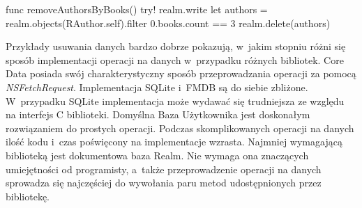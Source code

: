 \begin{code}[
		language=swift,
		caption={Przykład usuwania danych Realm},
		label={lis:realm_delete_code},
	]
    func removeAuthorsByBooks() {
        try! realm.write {
            let authors = realm.objects(RAuthor.self).filter { 0.books.count == 3 }
            realm.delete(authors)
        }
    }
\end{code}

Przykłady usuwania danych bardzo dobrze pokazują, w~jakim stopniu różni się sposób implementacji operacji na danych w~przypadku różnych bibliotek. Core Data posiada swój charakterystyczny sposób przeprowadzania operacji za pomocą \textit{NSFetchRequest}. Implementacja SQLite i~FMDB są do siebie zbliżone. W~przypadku SQLite implementacja może wydawać się trudniejsza ze względu na interfejs C biblioteki. Domyślna Baza Użytkownika jest doskonałym rozwiązaniem do prostych operacji. Podczas skomplikowanych operacji na danych ilość kodu i~czas poświęcony na implementacje wzrasta. Najmniej wymagającą biblioteką jest dokumentowa baza Realm. Nie wymaga ona znaczących umiejętności od programisty, a~także przeprowadzenie operacji na danych sprowadza się najczęściej do wywołania paru metod udostępnionych przez bibliotekę.